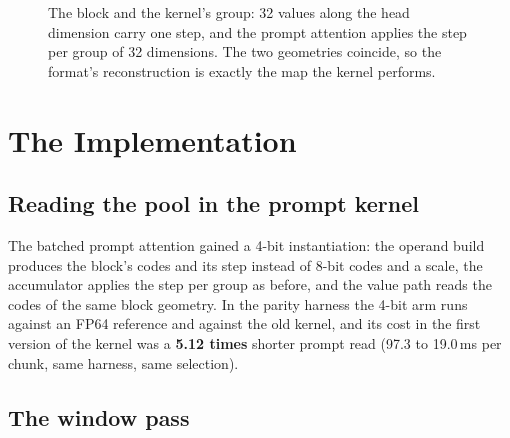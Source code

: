 \documentclass[10pt,twocolumn]{article}
\begin{document}
\begin{figure}[t]
\centering
{}
\caption{The block and the kernel's group: 32 values along the head dimension carry one step, and the
prompt attention applies the step per group of 32 dimensions. The two geometries coincide, so the format's
reconstruction is exactly the map the kernel performs.}
\label{fig:block}
\end{figure}


\section{The Implementation}
\label{sec:impl}

\subsection{Reading the pool in the prompt kernel}

The batched prompt attention gained a 4-bit instantiation: the operand build produces the block's codes
and its step instead of 8-bit codes and a scale, the accumulator applies the step per group as before, and
the value path reads the codes of the same block geometry. In the parity harness the 4-bit arm runs against
an FP64 reference and against the old kernel, and its cost in the first version of the kernel was a
\textbf{5.12 times} shorter prompt read (97.3 to 19.0\,ms per chunk, same harness, same selection).

\subsection{The window pass}
\end{document}
